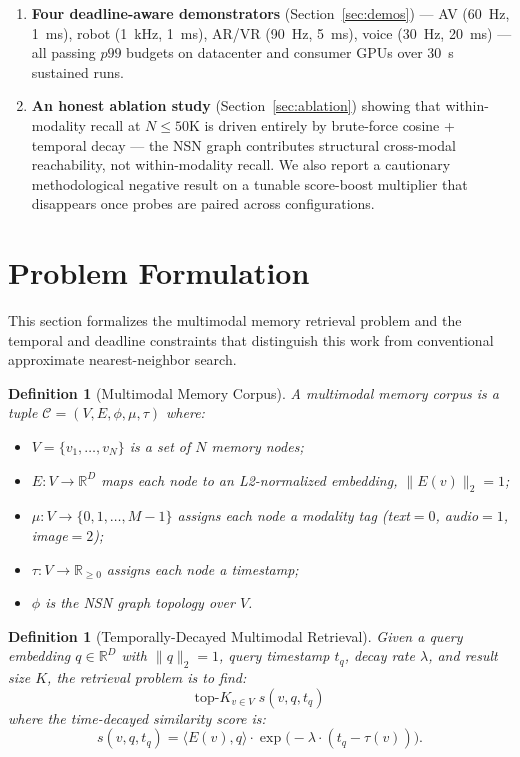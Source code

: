 \documentclass[11pt]{article}
\newtheorem{definition}[theorem]{Definition}
\begin{document}
\begin{enumerate}
\item \textbf{Four deadline-aware demonstrators}
  (Section~\ref{sec:demos}) --- AV (60~Hz, 1~ms), robot (1~kHz, 1~ms),
  AR/VR (90~Hz, 5~ms), voice (30~Hz, 20~ms) --- all passing $p99$
  budgets on datacenter and consumer GPUs over 30~s sustained runs.

\item \textbf{An honest ablation study}
  (Section~\ref{sec:ablation}) showing that within-modality recall at
  $N{\le}50$K is driven entirely by brute-force cosine + temporal
  decay --- the NSN graph contributes structural cross-modal
  reachability, not within-modality recall. We also report a
  cautionary methodological negative result on a tunable score-boost
  multiplier that disappears once probes are paired across configurations.
\end{enumerate}

\section{Problem Formulation}
\label{sec:formulation}

This section formalizes the multimodal memory retrieval problem and the
temporal and deadline constraints that distinguish this work from
conventional approximate nearest-neighbor search.

\begin{definition}[Multimodal Memory Corpus]
\label{def:corpus}
A multimodal memory corpus is a tuple
$\mathcal{C} = (V, E, \phi, \mu, \tau)$ where:
\begin{itemize}
\item $V = \{v_1, \ldots, v_N\}$ is a set of $N$ memory nodes;
\item $E: V \rightarrow \mathbb{R}^D$ maps each node to an
  L2-normalized embedding, $\|E(v)\|_2 = 1$;
\item $\mu: V \rightarrow \{0, 1, \ldots, M-1\}$ assigns each node a
  modality tag (text${=}0$, audio${=}1$, image${=}2$);
\item $\tau: V \rightarrow \mathbb{R}_{\geq 0}$ assigns each node a
  timestamp;
\item $\phi$ is the NSN graph topology over $V$.
\end{itemize}
\end{definition}

\begin{definition}[Temporally-Decayed Multimodal Retrieval]
\label{def:retrieval}
Given a query embedding $q \in \mathbb{R}^D$ with $\|q\|_2 = 1$, query
timestamp $t_q$, decay rate $\lambda$, and result size $K$, the
retrieval problem is to find:
\[
\mathrm{top}\text{-}K_{v \in V} \; s(v, q, t_q)
\]
where the time-decayed similarity score is:
\[
s(v, q, t_q) = \langle E(v), q \rangle \cdot
  \exp\!\bigl(-\lambda \cdot (t_q - \tau(v))\bigr).
\]
\end{definition}
\end{document}
